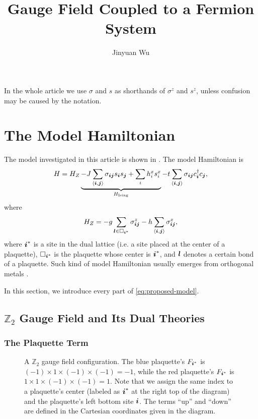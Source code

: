 \documentclass[hyperref, a4paper]{article}
\title{\Ztwo Gauge Field Coupled to a Fermion System}
\author{Jinyuan Wu}
\newcommand*{\pair}[1]{\langle #1 \rangle}
\newcommand*{\Ztwo}{$\mathbb{Z}_2$ }
\begin{document}
\maketitle

In the whole article we use $\sigma$ and $s$ as shorthands of $\sigma^z$ and $s^z$, unless confusion may be caused by the notation.

\section{The Model Hamiltonian}

The model investigated in this article is shown in \cite{moon2019deconfined}.
The model Hamiltonian is 
\begin{equation}
    H = H_Z \underbrace{- J \sum_{\pair{\vb*{i}, \vb*{j}}} \sigma_{\vb*{i} \vb*{j}} s_{\vb*{i}} s_{\vb*{j}} + \sum_i h^x_i s^x_i}_{H_\text{Ising}} - t \sum_{\pair{\vb*{i}, \vb*{j}}} \sigma_{\vb*{i} \vb*{j}} c^\dagger_{\vb*{i}} c_{\vb*{j}},
    \label{eq:proposed-model}
\end{equation}
where
\begin{equation}
    H_Z = - g \sum_{\vb*{l} \in \Box_{\vb*{i}^*}} \sigma_{\vb*{i} \vb*{j}}^z - h \sum_{\pair{\vb*{i}, \vb*{j}}} \sigma^x_{\vb*{i} \vb*{j}}, 
\end{equation}
where $\vb*{i}^*$ is a site in the dual lattice (i.e. a site placed at the center of a plaquette), 
$\Box_{\vb*{i}^*}$ is the plaquette whose center is $\vb*{i}^*$, and $\vb*{l}$ denotes a certain bond of a plaquette.
Such kind of model Hamiltonian usually emerges from orthogonal metals \cite{moon2019deconfined, orthogonal_metal}.

In this section, we introduce every part of \eqref{eq:proposed-model}.

\subsection{\Ztwo Gauge Field and Its Dual Theories}

\subsubsection{The Plaquette Term}

\begin{figure}
    \centering
    
    \caption{A \Ztwo gauge field configuration. The blue plaquette's $F_{\vb*{i}^*}$ is $(-1) \times 1 \times (-1) \times (-1) = -1$, %
    while the red plaquette's $F_{\vb*{i}^*}$ is $1 \times 1 \times (-1) \times (-1) = 1$. %
    Note that we assign the same index to a plaquette's center (labeled as $\vb*{i}^*$ at the right top of the diagram) %
    and the plaquette's left bottom site $\vb*{i}$. %
    The terms ``up'' and ``down'' are defined in the Cartesian coordinates given in the diagram.}
    \label{fig:z2-gauge-field}
\end{figure}
\end{document}
